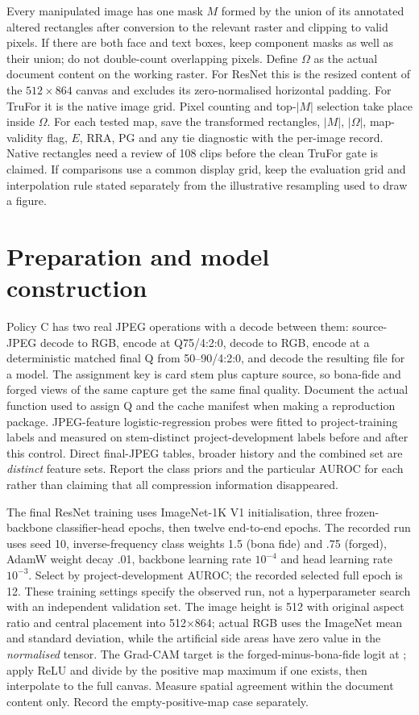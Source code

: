 Every manipulated image has one mask $M$ formed by the union of its annotated altered rectangles after conversion to the relevant raster and clipping to valid pixels. If there are both face and text boxes, keep component masks as well as their union; do not double-count overlapping pixels. Define $\Omega$ as the actual document content on the working raster. For ResNet this is the resized content of the $512\times864$ canvas and excludes its zero-normalised horizontal padding. For TruFor it is the native image grid. Pixel counting and top-$|M|$ selection take place inside $\Omega$. For each tested map, save the transformed rectangles, $|M|$, $|\Omega|$, map-validity flag, $E$, RRA, PG and any tie diagnostic with the per-image record. Native rectangles need a review of 108 clips before the clean TruFor gate is claimed. If comparisons use a common display grid, keep the evaluation grid and interpolation rule stated separately from the illustrative resampling used to draw a figure.

\section{Preparation and model construction}
\label{app:method-preparation}

Policy C has two real JPEG operations with a decode between them: source-JPEG decode to RGB, encode at Q75/4:2:0, decode to RGB, encode at a deterministic matched final Q from 50--90/4:2:0, and decode the resulting file for a model. The assignment key is card stem plus capture source, so bona-fide and forged views of the same capture get the same final quality. Document the actual function used to assign Q and the cache manifest when making a reproduction package. JPEG-feature logistic-regression probes were fitted to project-training labels and measured on stem-distinct project-development labels before and after this control. Direct final-JPEG tables, broader history and the combined set are \emph{distinct} feature sets. Report the class priors and the particular AUROC for each rather than claiming that all compression information disappeared.

The final ResNet training uses ImageNet-1K V1 initialisation, three frozen-backbone classifier-head epochs, then twelve end-to-end epochs. The recorded run uses seed 10, inverse-frequency class weights 1.5 (bona fide) and .75 (forged), AdamW weight decay .01, backbone learning rate $10^{-4}$ and head learning rate $10^{-3}$. Select by project-development AUROC; the recorded selected full epoch is 12. These training settings specify the observed run, not a hyperparameter search with an independent validation set. The image height is 512 with original aspect ratio and central placement into 512$\times$864; actual RGB uses the ImageNet mean and standard deviation, while the artificial side areas have zero value in the \emph{normalised} tensor. The Grad-CAM target is the forged-minus-bona-fide logit at ; apply ReLU and divide by the positive map maximum if one exists, then interpolate to the full canvas. Measure spatial agreement within the document content only. Record the empty-positive-map case separately.

